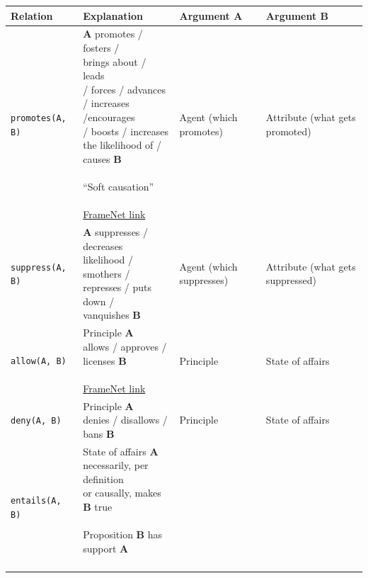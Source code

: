 \begin{footnotesize}
\begin{tabular}{lp{5cm}p{2.5cm}p{3cm}}
\toprule
Relation & Explanation & Argument A & Argument B \\
\midrule
\texttt{promotes(A, B)} & 
\makecell[cl]{
\textbf{A} promotes / fosters / \\
brings about / leads \\ 
/ forces / advances \\
/ increases /encourages \\
/ boosts / increases \\
the likelihood of / causes \textbf{B}  \\ \\
``Soft causation'' \\\\
\href{https://framenet2.icsi.berkeley.edu/fnReports/data/frameIndex.xml?frame=Cause_change_of_position_on_a_scale}{FrameNet link} 
}
& 
Agent (which promotes) & 
Attribute (what gets promoted) \\
\midrule
\texttt{suppress(A, B)} & 
\makecell[cl]{
\textbf{A} suppresses / decreases \\ 
likelihood / smothers / \\
represses / puts down / \\
vanquishes \textbf{B} 
}
&
Agent (which suppresses) & 
Attribute (what gets suppressed)
\\
\midrule
\texttt{allow(A, B)} & 
\makecell[cl]{
Principle \textbf{A} \\ 
allows / approves / \\
licenses \textbf{B} \\\\
\href{https://framenet2.icsi.berkeley.edu/fnReports/data/frameIndex.xml?frame=Prohibiting_or_licensing}{FrameNet link}
} & 
Principle
& 
State of affairs \\
\midrule
\texttt{deny(A, B)} & 
\makecell[cl]{
Principle \textbf{A} \\
denies / disallows /
bans \textbf{B} } & 
Principle & 
State of affairs\\
\midrule
\texttt{entails(A, B)} & 
\makecell[cl]{
State of affairs \textbf{A} \\
necessarily, per definition \\
or causally, makes \textbf{B} true \\\\
Proposition \textbf{B} has \\
support \textbf{A} \\\\
}
\end{tabular}
\end{footnotesize}
